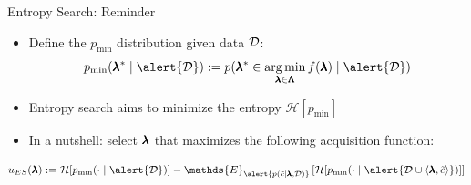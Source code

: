 \begin{frame}[c]{Entropy Search: Reminder}

\begin{itemize}
		\item Define the $p_{\text{min}}$ distribution given data $\mathcal{D}$:
		$$p_{\text{min}}(\conf^* \mid \alert{\dataset}) := p(\conf^* \in \argmin_{\conf\in \pcs} \func(\conf) \mid \alert{\dataset})$$
	
		\item Entropy search  aims to minimize the entropy \alert{$\mathcal{H}[p_\text{min}]$}
\bigskip
\pause
		\item In a nutshell: select 
$\pmb{\lambda}$ that maximizes the following acquisition function:
\end{itemize}
\vspace*{0.5cm}
	\[{\acq}_{ES}(\conf) := \mathcal{H}[p_{\text{min}}(\cdot \mid \alert{\dataset})] - \mathds{E}_{\alert{p(\tilde{\cost}\mid \conf, \dataset)}} 
	\left[   \mathcal{H}[p_{\text{min}}(\cdot \mid \alert{\dataset \cup \left\langle \conf, \tilde{\cost} \right\rangle })] \right]\]

\end{frame}

